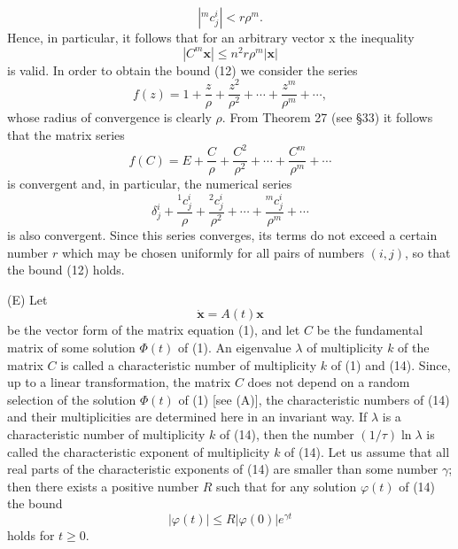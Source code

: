 \documentclass[10pt,a5paper]{book}
\theoremstyle{plain}
\theoremstyle{definition}
\theoremstyle{remark}
\begin{document}
\begin{equation*}
\left|{ }^{m} c_{j}^{i}\right|<r \rho^{m} . \tag{12}
\end{equation*}
Hence, in particular, it follows that for an arbitrary vector x the inequality
\begin{equation*}
\left|C^{m} \mathbf{x}\right| \leq n^{2} r \rho^{m}|\mathbf{x}| \tag{13}
\end{equation*}
is valid. In order to obtain the bound (12) we consider the series
\[
f(z)=1+\frac{z}{\rho}+\frac{z^{2}}{\rho^{2}}+\cdots+\frac{z^{m}}{\rho^{m}}+\cdots,
\]
whose radius of convergence is clearly $\rho$. From Theorem 27 (see §33) it follows that the matrix series
\[
f(C)=E+\frac{C}{\rho}+\frac{C^{2}}{\rho^{2}}+\cdots+\frac{C^{m}}{\rho^{m}}+\cdots
\]
is convergent and, in particular, the numerical series
\[
\delta_{j}^{i}+\frac{{ }^{1} c_{j}^{i}}{\rho}+\frac{{ }^{2} c_{j}^{i}}{\rho^{2}}+\cdots+\frac{{ }^{m} c_{j}^{i}}{\rho^{m}}+\cdots
\]
is also convergent. Since this series converges, its terms do not exceed a certain number $r$ which may be chosen uniformly for all pairs of numbers $(i, j)$, so that the bound (12) holds.

(E) Let
\begin{equation*}
\dot{\mathbf{x}}=A(t) \mathbf{x} \tag{14}
\end{equation*}
be the vector form of the matrix equation (1), and let $C$ be the fundamental matrix of some solution $\Phi(t)$ of (1). An eigenvalue $\lambda$ of multiplicity $k$ of the matrix $C$ is called a characteristic number of multiplicity $k$ of (1) and (14). Since, up to a linear transformation, the matrix $C$ does not depend on a random selection of the solution $\Phi(t)$ of (1) [see (A)], the characteristic numbers of (14) and their multiplicities are determined here in an invariant way. If $\lambda$ is a characteristic number of multiplicity $k$ of (14), then the number $(1 / \tau) \ln \lambda$ is called the characteristic exponent of multiplicity $k$ of (14). Let us assume that all real parts of the characteristic exponents of (14) are smaller than some number $\gamma$; then there exists a
positive number $R$ such that for any solution $\varphi(t)$ of (14) the bound
\begin{equation*}
|\varphi(t)| \leq R|\varphi(0)| e^{\gamma t} \tag{15}
\end{equation*}
holds for $t \geq 0$.
\end{document}

